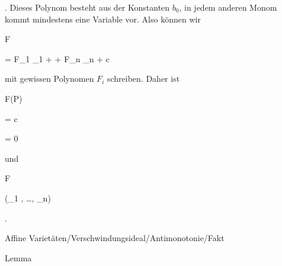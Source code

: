 {{{    }{
}


{   }{
}


}
{}{}{.}
Dieses Polynom besteht aus der Konstanten $b_0$, in jedem anderen Monom kommt mindestens eine Variable vor. Also können wir


\mavergleichskettedisp


{\vergleichskette


{F
}


{ =} { F_1 _1 + \cdots + F_n _n + c
}


{ } {
}


{ } {
}


{ } {
}


}
{}{}{}
mit gewissen Polynomen $F_i$ schreiben. Daher ist


\mavergleichskette


{\vergleichskette


{ F(P)
}


{ = }{ c
}


{ = }{ 0
}


{    }{
}


{   }{
}


}
{}{}{}
und


\mavergleichskette


{\vergleichskette


{ F
}


{ \in }{ (_1 , \ldots ,  _n)
}


{  }{
}


{    }{
}


{   }{
}


}
{}{}{.}


}




{Affine Varietäten/Verschwindungsideal/Antimonotonie/Fakt}


{Lemma}


{}


{






\faktzusatz {}


\faktzusatz {}


}


